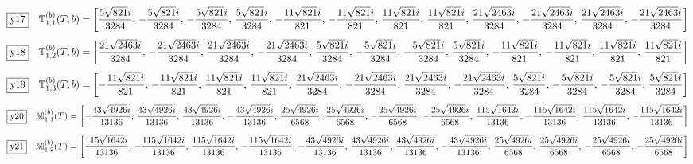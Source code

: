 \documentclass[fleqn,10pt,landscape]{jsarticle}
\begin{document}
\begin{dmath*}
\fbox{y17}\quad \mathbb{T}_{1,1}^{(b)}(T,b)=\left[ \frac{5 \sqrt{821} i}{3284},\, - \frac{5 \sqrt{821} i}{3284},\, - \frac{5 \sqrt{821} i}{3284},\, \frac{5 \sqrt{821} i}{3284},\, - \frac{11 \sqrt{821} i}{821},\, - \frac{11 \sqrt{821} i}{821},\, \frac{11 \sqrt{821} i}{821},\, \frac{11 \sqrt{821} i}{821},\, \frac{21 \sqrt{2463} i}{3284},\, - \frac{21 \sqrt{2463} i}{3284},\, \frac{21 \sqrt{2463} i}{3284},\, - \frac{21 \sqrt{2463} i}{3284} \right]
\end{dmath*}
\begin{dmath*}
\fbox{y18}\quad \mathbb{T}_{1,2}^{(b)}(T,b)=\left[ \frac{21 \sqrt{2463} i}{3284},\, - \frac{21 \sqrt{2463} i}{3284},\, \frac{21 \sqrt{2463} i}{3284},\, - \frac{21 \sqrt{2463} i}{3284},\, \frac{5 \sqrt{821} i}{3284},\, - \frac{5 \sqrt{821} i}{3284},\, - \frac{5 \sqrt{821} i}{3284},\, \frac{5 \sqrt{821} i}{3284},\, - \frac{11 \sqrt{821} i}{821},\, - \frac{11 \sqrt{821} i}{821},\, \frac{11 \sqrt{821} i}{821},\, \frac{11 \sqrt{821} i}{821} \right]
\end{dmath*}
\begin{dmath*}
\fbox{y19}\quad \mathbb{T}_{1,3}^{(b)}(T,b)=\left[ - \frac{11 \sqrt{821} i}{821},\, - \frac{11 \sqrt{821} i}{821},\, \frac{11 \sqrt{821} i}{821},\, \frac{11 \sqrt{821} i}{821},\, \frac{21 \sqrt{2463} i}{3284},\, - \frac{21 \sqrt{2463} i}{3284},\, \frac{21 \sqrt{2463} i}{3284},\, - \frac{21 \sqrt{2463} i}{3284},\, \frac{5 \sqrt{821} i}{3284},\, - \frac{5 \sqrt{821} i}{3284},\, - \frac{5 \sqrt{821} i}{3284},\, \frac{5 \sqrt{821} i}{3284} \right]
\end{dmath*}
\begin{dmath*}
\fbox{y20}\quad \mathbb{M}_{1,1}^{(b)}(T)=\left[ - \frac{43 \sqrt{4926} i}{13136},\, \frac{43 \sqrt{4926} i}{13136},\, \frac{43 \sqrt{4926} i}{13136},\, - \frac{43 \sqrt{4926} i}{13136},\, \frac{25 \sqrt{4926} i}{6568},\, \frac{25 \sqrt{4926} i}{6568},\, - \frac{25 \sqrt{4926} i}{6568},\, - \frac{25 \sqrt{4926} i}{6568},\, \frac{115 \sqrt{1642} i}{13136},\, - \frac{115 \sqrt{1642} i}{13136},\, \frac{115 \sqrt{1642} i}{13136},\, - \frac{115 \sqrt{1642} i}{13136} \right]
\end{dmath*}
\begin{dmath*}
\fbox{y21}\quad \mathbb{M}_{1,2}^{(b)}(T)=\left[ \frac{115 \sqrt{1642} i}{13136},\, - \frac{115 \sqrt{1642} i}{13136},\, \frac{115 \sqrt{1642} i}{13136},\, - \frac{115 \sqrt{1642} i}{13136},\, - \frac{43 \sqrt{4926} i}{13136},\, \frac{43 \sqrt{4926} i}{13136},\, \frac{43 \sqrt{4926} i}{13136},\, - \frac{43 \sqrt{4926} i}{13136},\, \frac{25 \sqrt{4926} i}{6568},\, \frac{25 \sqrt{4926} i}{6568},\, - \frac{25 \sqrt{4926} i}{6568},\, - \frac{25 \sqrt{4926} i}{6568} \right]
\end{dmath*}
\end{document}
